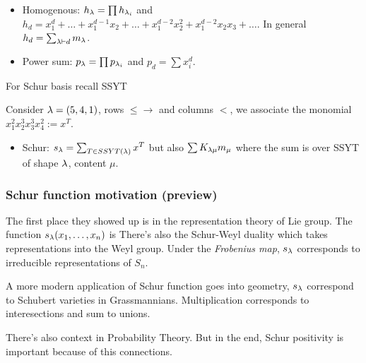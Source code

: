 \documentclass[12pt]{memoir}
\begin{document}
\begin{itemize}
    
    \item Homogenous: $h_\lambda=\prod h_{\lambda_i}$ and $h_d=x_1^d+\dots+x_1^{d-1}x_2+\dots+x_1^{d-2}x_2^2+x_1^{d-2}x_2x_3+\dots$. In general $h_d=\sum_{\lambda\vdash d}m_\lambda$.
    \item Power sum: $p_\lambda=\prod p_{\lambda_i}$ and $p_d=\sum x_i^d$.
\end{itemize}

For Schur basis recall SSYT 

\begin{Ex}
    Consider $\lambda=(5,4,1)$, rows $\leq\to$ and columns $<$, we associate the monomial $x_1^2x_2^3x_3^3x_4^2:=x^T$.
\end{Ex}

\begin{itemize}
    \itemsep=-0.4em
    \item Schur: $s_\lambda=\sum_{T\in SSYT(\lambda)}x^T$ but also $\sum K_{\lambda\mu}m_\mu$ where the sum is over SSYT of shape $\lambda$, content $\mu$.
\end{itemize}

\subsubsection{Schur function motivation (preview)}

The first place they showed up is in the representation theory of Lie group.  The function $s_\lambda(x_1,\dots,x_n)$ is %
There's also the Schur-Weyl duality which takes representations into the Weyl group. Under the \emph{Frobenius map}, $s_\lambda$ corresponds to irreducible representations of $S_n$.\par 
A more modern application of Schur function goes into geometry, $s_\lambda$ correspond to Schubert varieties in Grassmannians. Multiplication corresponds to interesections and sum to unions.\par 
There's also context in Probability Theory. But in the end, Schur positivity is important because of this connections. 
\end{document}
